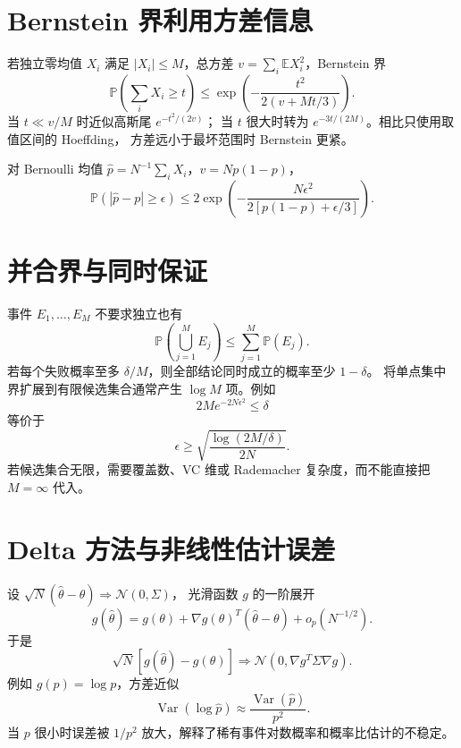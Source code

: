 \documentclass[11pt]{article}
\numberwithin{equation}{section}
\newcommand{\E}{\mathbb{E}}
\newcommand{\Pp}{\mathbb{P}}
\newcommand{\1}{\mathbf{1}}
\newcommand{\cN}{\mathcal{N}}
\newcommand{\Var}{\operatorname{Var}}
\begin{document}
\section{Bernstein 界利用方差信息}

若独立零均值 $X_i$ 满足 $|X_i|\le M$，总方差
$v=\sum_i\E X_i^2$，Bernstein 界
\begin{equation}
 \Pp\left(\sum_iX_i\ge t\right)
 \le\exp\left(-\frac{t^2}{2(v+Mt/3)}\right).
\end{equation}
当 $t\ll v/M$ 时近似高斯尾 $e^{-t^2/(2v)}$；
当 $t$ 很大时转为 $e^{-3t/(2M)}$。相比只使用取值区间的 Hoeffding，
方差远小于最坏范围时 Bernstein 更紧。

对 Bernoulli 均值 $\widehat p=N^{-1}\sum_iX_i$，$v=Np(1-p)$，
\begin{equation}
 \Pp(|\widehat p-p|\ge\epsilon)
 \le2\exp\left(-\frac{N\epsilon^2}
 {2[p(1-p)+\epsilon/3]}\right).
\end{equation}

\section{并合界与同时保证}

事件 $E_1,…,E_M$ 不要求独立也有
\begin{equation}
 \Pp\left(\bigcup_{j=1}^{M}E_j\right)
 \le\sum_{j=1}^{M}\Pp(E_j).
\end{equation}
若每个失败概率至多 $\delta/M$，则全部结论同时成立的概率至少 $1-\delta$。
将单点集中界扩展到有限候选集合通常产生 $\log M$ 项。例如
\begin{equation}
 2M e^{-2N\epsilon^2}\le\delta
\end{equation}
等价于
\begin{equation}
 \epsilon\ge\sqrt{\frac{\log(2M/\delta)}{2N}}.
\end{equation}
若候选集合无限，需要覆盖数、VC 维或 Rademacher 复杂度，而不能直接把 $M=\infty$ 代入。

\section{Delta 方法与非线性估计误差}

设 $\sqrt N(\widehat\theta-\theta)\Rightarrow\cN(0,\Sigma)$，
光滑函数 $g$ 的一阶展开
\begin{equation}
 g(\widehat\theta)=g(\theta)+
 \nabla g(\theta)^T(\widehat\theta-\theta)+o_p(N^{-1/2}).
\end{equation}
于是
\begin{equation}
 \sqrt N[g(\widehat\theta)-g(\theta)]
 \Rightarrow\cN(0,\nabla g^T\Sigma\nabla g).
\end{equation}
例如 $g(p)=\log p$，方差近似
\begin{equation}
 \Var(\log\widehat p)\approx\frac{\Var(\widehat p)}{p^2}.
\end{equation}
当 $p$ 很小时误差被 $1/p^2$ 放大，解释了稀有事件对数概率和概率比估计的不稳定。
\end{document}
